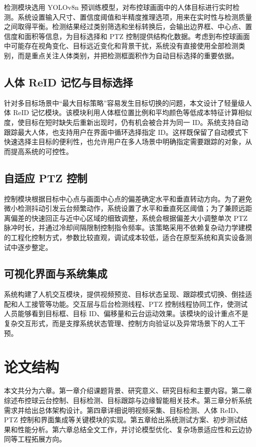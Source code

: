 检测模块选用 YOLOv8n 预训练模型，对布控球画面中的人体目标进行实时检测。系统设置输入尺寸、置信度阈值和半精度推理选项，用来在实时性与检测质量之间取得平衡。检测结果经过类别筛选和坐标转换后，会输出边界框、中心点、置信度和面积等信息，为目标选择和 PTZ 控制提供结构化数据。考虑到布控球画面中可能存在视角变化、目标远近变化和背景干扰，系统没有直接使用全部检测类别，而是重点关注人体类别，并把检测框面积作为自动目标选择的重要依据。

\subsection{人体 ReID 记忆与目标选择}

针对多目标场景中“最大目标策略”容易发生目标切换的问题，本文设计了轻量级人体 ReID 记忆模块。该模块利用人体框位置比例和平均颜色等低成本特征计算相似度，使目标在短时缺失后重新出现时，仍有机会被合并为同一 ID。系统支持自动跟踪最大人体，也支持用户在界面中循环选择指定 ID。这样既保留了自动模式下快速选择主目标的便利性，也允许用户在多人场景中明确指定需要跟踪的对象，从而提高系统的可控性。

\subsection{自适应 PTZ 控制}

控制模块根据目标中心点与画面中心点的偏差确定水平和垂直转动方向。为了避免微小检测抖动引发云台频繁动作，系统设置了水平和垂直死区阈值；为了兼顾远距离偏差的快速回正与近中心区域的细致调整，系统会根据偏差大小调整单次 PTZ 脉冲时长，并通过冷却间隔限制控制指令频率。该策略采用不依赖复杂动力学建模的工程化控制方式，参数比较直观，调试成本较低，适合在原型系统和真实设备测试中逐步整定。

\subsection{可视化界面与系统集成}

系统构建了人机交互模块，提供视频预览、目标状态呈现、跟踪模式切换、倒挂适配和人工接管等功能。交互层与后台检测线程、PTZ 控制线程协同工作，使测试人员能够看到目标框、目标 ID、偏移量和云台运动效果。该模块的设计重点不是复杂交互形式，而是支撑系统状态管理、控制方向验证以及异常场景下的人工干预。

\section{论文结构}

本文共分为六章。第一章介绍课题背景、研究意义、研究目标和主要内容。第二章综述布控球云台控制、目标检测、目标跟踪与边缘智能相关技术。第三章分析系统需求并给出总体架构设计。第四章详细说明视频采集、目标检测、人体 ReID、PTZ 控制和界面集成等关键模块的实现。第五章给出系统测试方案、初步测试结果和性能分析。第六章总结全文工作，并讨论模型优化、复杂场景适应性和云边协同等工程拓展方向。
